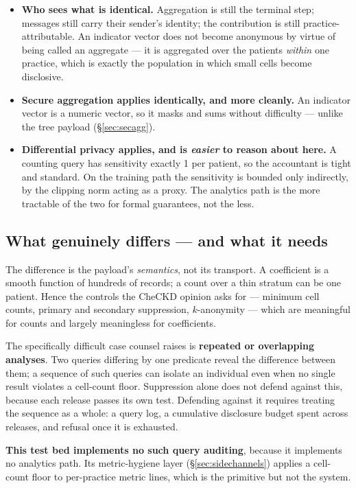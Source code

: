 \begin{itemize}
  \item \textbf{Who sees what is identical.} Aggregation is still the terminal step; messages still
        carry their sender's identity; the contribution is still practice-attributable. An indicator
        vector does not become anonymous by virtue of being called an aggregate --- it is aggregated
        over the patients \emph{within} one practice, which is exactly the population in which small
        cells become disclosive.
  \item \textbf{Secure aggregation applies identically, and more cleanly.} An indicator vector is a
        numeric vector, so it masks and sums without difficulty --- unlike the tree payload
        (\S\ref{sec:secagg}).
  \item \textbf{Differential privacy applies, and is \emph{easier} to reason about here.} A counting
        query has sensitivity exactly 1 per patient, so the accountant is tight and standard. On the
        training path the sensitivity is bounded only indirectly, by the clipping norm acting as a
        proxy. The analytics path is the more tractable of the two for formal guarantees, not the
        less.
\end{itemize}

\subsection{What genuinely differs --- and what it needs}

The difference is the payload's \emph{semantics}, not its transport. A coefficient is a smooth
function of hundreds of records; a count over a thin stratum can be one patient. Hence the controls
the CheCKD opinion asks for --- minimum cell counts, primary and secondary suppression,
$k$-anonymity --- which are meaningful for counts and largely meaningless for coefficients.

The specifically difficult case counsel raises is \textbf{repeated or overlapping analyses}. Two
queries differing by one predicate reveal the difference between them; a sequence of such queries can
isolate an individual even when no single result violates a cell-count floor. Suppression alone does
not defend against this, because each release passes its own test. Defending against it requires
treating the sequence as a whole: a query log, a cumulative disclosure budget spent across releases,
and refusal once it is exhausted.

\textbf{This test bed implements no such query auditing}, because it implements no analytics path.
Its metric-hygiene layer (\S\ref{sec:sidechannels}) applies a cell-count floor to per-practice metric
lines, which is the primitive but not the system.

